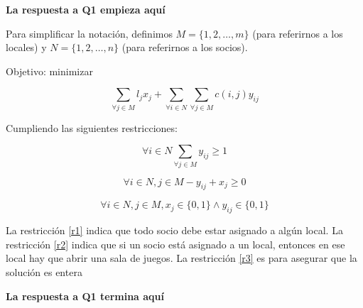 \textbf{La respuesta a Q1 empieza aquí}

Para simplificar la notación, definimos $M = \{1,2,\dots,m\}$ (para referirnos a los locales) y $N = \{1,2,\dots,n\}$ (para referirnos a los socios).

Objetivo: minimizar

\begin{equation}
 \sum_{\forall j \in M} l_jx_j + \sum_{\forall i \in N} \sum_{\forall j \in M} c(i,j)y_{ij}
\end{equation}

Cumpliendo las siguientes restricciones:

\begin{equation}
\label{r1}
 \forall i \in N \sum_{\forall j \in M} y_{ij} \geq 1
\end{equation}

\begin{equation}
\label{r2}
 \forall i \in N, j \in M -y_{ij} + x_j \geq 0
\end{equation}

\begin{equation}
\label{r3}
 \forall i \in N, j \in M, x_j \in \{0,1\} \wedge y_{ij} \in \{0,1\} 
\end{equation}

La restricción \ref{r1} indica que todo socio debe estar asignado a algún local. La restricción \ref{r2} indica que si un socio está asignado a un local, entonces en ese local hay que abrir una sala de juegos. La restricción \ref{r3} es para asegurar que la solución es entera

\textbf{La respuesta a Q1 termina aquí}
